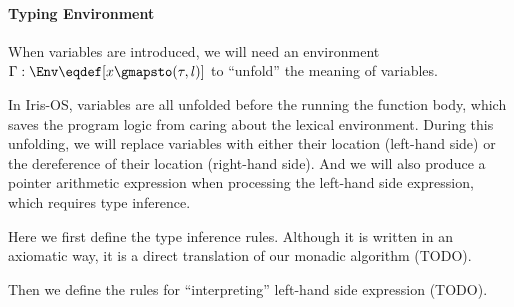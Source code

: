 \paragraph{Typing Environment}

When variables are introduced, we will need an environment $\Gamma : \Env \eqdef [x \gmapsto (\tau, l)]$
to ``unfold'' the meaning of variables.

In Iris-OS, variables are all unfolded before the running the function body,
which saves the program logic from caring about the lexical environment.
During this unfolding, we will replace variables with either their location (left-hand side)
or the dereference of their location (right-hand side). And we will also produce a pointer arithmetic
expression when processing the left-hand side expression, which requires type inference.

Here we first define the type inference rules. Although it is written in an axiomatic way,
it is a direct translation of our monadic algorithm (TODO).

Then we define the rules for ``interpreting'' left-hand side expression (TODO).

